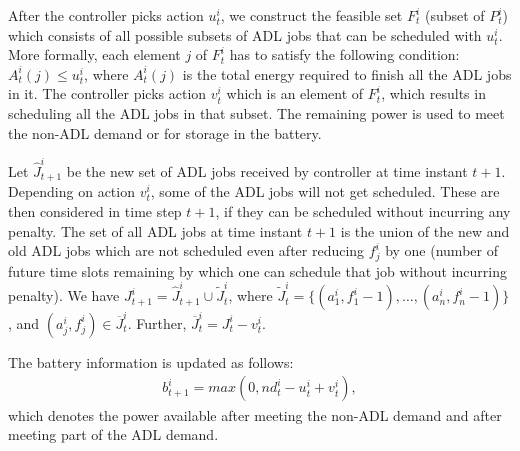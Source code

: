 After the controller picks action $u_{t}^{i}$, we construct the feasible set $F_{t}^{i}$ (subset of $P_{t}^{i}$) which  consists of all possible subsets of ADL jobs that can be scheduled with $u_{t}^{i}$. More formally, each element $j$ of  $F_{t}^{i}$ has to satisfy the following condition:   $A_t^i(j) \leq u_{t}^{i} $, where $A_t^i(j)$ is the total energy required to finish all the ADL jobs in it. The controller picks action $v_{t}^{i}$ which is an element of $F_{t}^{i}$, which results in scheduling all the ADL jobs in that subset. The remaining power is used to meet the non-ADL demand or for storage in the battery.

 Let $\widehat J_{t+1}^{i}$ be the new set of ADL jobs received by controller at time instant $t+1$. Depending on action $v_{t}^{i}$, some of the ADL jobs will not get scheduled. These are then considered in time step $t+1$, if they can be scheduled without incurring any penalty. The set of all ADL jobs at time instant $t+1$ is the union of the new and old ADL jobs which are not scheduled even after reducing $f_{j}^{i}$ by one (number of future time slots remaining by which one can schedule that job without incurring penalty).
We have $J_{t+1}^{i} = \widehat J_{t+1}^{i} \cup \widetilde J_{t}^{i}$, where $\widetilde J_{t}^{i} =  \{(a_{1}^{i}, f_{1}^{i} - 1),\ldots,(a_{n}^{i}, f_{n}^{i} - 1)\}$, and $ (a_{j}^{i}, f_{j}^{i}) \in \overline J_{t}^{i}$. Further, $\overline J_{t}^{i} = J_{t}^{i} - v_{t}^{i}$.

The battery information is updated as follows:
\begin{align}
b_{t+1}^{i} = max(0,nd_{t}^{i} - u_{t}^{i} + v_{t}^{i}),
\end{align}
which denotes the power available after meeting the non-ADL demand and after meeting part of the ADL demand.
